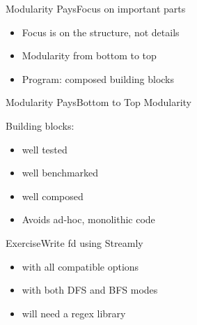 \documentclass[17pt]{beamer}
\begin{document}
\begin{frame}{Modularity Pays}{Focus on important parts}
\begin{itemize}
  \item Focus is on the structure, not details
  \item Modularity from bottom to top
  \item Program: composed building blocks
\end{itemize}
\end{frame}

\begin{frame}{Modularity Pays}{Bottom to Top Modularity}

Building blocks:
\begin{itemize}
  \item well tested
  \item well benchmarked
  \item well composed
  \item Avoids ad-hoc, monolithic code
\end{itemize}
\end{frame}

\begin{frame}{Exercise}{Write fd using Streamly}
\begin{itemize}
  \item with all compatible options
  \item with both DFS and BFS modes
  \item will need a regex library
\end{itemize}
\end{frame}
\end{document}
